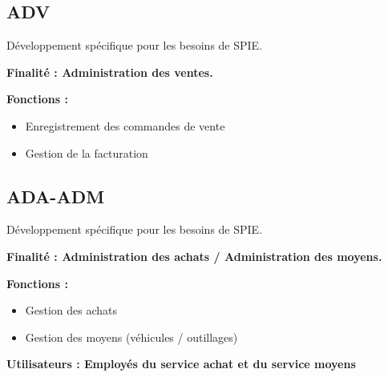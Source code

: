 \subsection{ADV}
Développement spécifique pour les besoins de SPIE.
\begin{description}
    \item \bf{Finalité :} Administration des ventes. \\
    \item \bf{Fonctions :}
    \begin{itemize}
        \item Enregistrement des commandes de vente
        \item Gestion de la facturation
    \end{itemize}
\end{description}

\subsection{ADA-ADM}
Développement spécifique pour les besoins de SPIE.
\begin{description}
    \item \bf{Finalité :} Administration des achats / Administration des moyens. \\
    \item \bf{Fonctions :}
    \begin{itemize}
        \item Gestion des achats
        \item Gestion des moyens (véhicules / outillages) \\
    \end{itemize}
    \item \bf{Utilisateurs :} Employés du service achat et du service moyens
\end{description}

